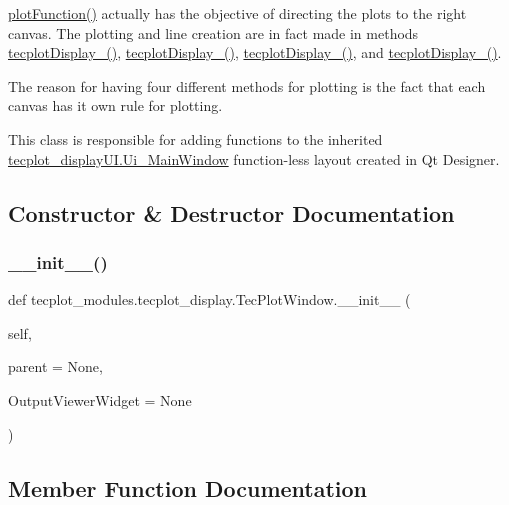 \hyperlink{a00110_a62c9724fbeda8d8780e57559bada3282}{plot\+Function()} actually has the objective of directing the plots to the right canvas. The plotting and line creation are in fact made in methods \hyperlink{a00110_ae792d997329b65cfed0b8a0a5feaa1a2}{tecplot\+Display\+\_()}, \hyperlink{a00110_aec1f3f862b488e5f66161ca7241908c1}{tecplot\+Display\+\_()}, \hyperlink{a00110_ae29c235476c3ca1ff19f4b933b86ed86}{tecplot\+Display\+\_()}, and \hyperlink{a00110_acdc9dc387494507084a2ab2cc0c8d9ac}{tecplot\+Display\+\_()}.

The reason for having four different methods for plotting is the fact that each canvas has it own rule for plotting.

This class is responsible for adding functions to the inherited \hyperlink{a00114}{tecplot\+\_\+display\+U\+I.\+Ui\+\_\+\+Main\+Window} function-\/less layout created in Qt Designer. 

\subsection{Constructor \& Destructor Documentation}
\hypertarget{a00110_abc270dcf6e8aaa3a645ae0258c4a9e5e}{}\label{a00110_abc270dcf6e8aaa3a645ae0258c4a9e5e} 
\subsubsection{\texorpdfstring{\+\_\+\+\_\+init\+\_\+\+\_\+()}{\_\_init\_\_()}}
{\footnotesize\ttfamily def tecplot\+\_\+modules.\+tecplot\+\_\+display.\+Tec\+Plot\+Window.\+\_\+\+\_\+init\+\_\+\+\_\+ (\begin{DoxyParamCaption}\item[{}]{self,  }\item[{}]{parent = {\ttfamily None},  }\item[{}]{Output\+Viewer\+Widget = {\ttfamily None} }\end{DoxyParamCaption})}



\subsection{Member Function Documentation}
\hypertarget{a00110_a6b4350a2c6ee537dba6bbe1549778636}{}\label{a00110_a6b4350a2c6ee537dba6bbe1549778636} 
